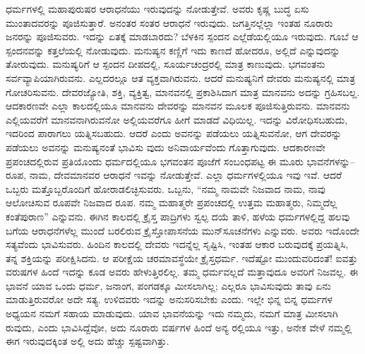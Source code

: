 ಧರ್ಮಗಳಲ್ಲಿ ಮಹಾಪುರುಷರ ಆರಾಧನೆಯು ಇರುವುದನ್ನು ನೋಡುತ್ತೇವೆ. ಅವರು ಕೃಷ್ಣ ಬುದ್ಧ ಏಸು ಮುಂತಾದವರನ್ನು ಪೂಜಿಸುತ್ತಾರೆ. ಅನಂತರ ಸಂತರ ಆರಾಧನೆ ಇರುವುದು. ಜಗತ್ತಿನಲ್ಲೆಲ್ಲಾ ಇಂತಹ ನೂರಾರು ಜನರನ್ನು ಪೂಜಿಸುವರು. ಇದನ್ನು ಏತಕ್ಕೆ ಮಾಡಬಾರದು? ಬೆಳಕಿನ ಸ್ಪಂದನ ಎಲ್ಲೆಡೆಯಲ್ಲಿಯೂ ಇರುವುದು. ಗೂಬೆ ಆ ಸ್ಪಂದನವನ್ನು ಕತ್ತಲೆಯಲ್ಲಿ ನೋಡುವುದು. ಮನುಷ್ಯನ ಕಣ್ಣಿಗೆ ಇದು ಕಾಣದೆ ಹೋದರೂ, ಅಲ್ಲಿದೆ ಎನ್ನುವುದನ್ನು ತೋರುವುದು. ಮನುಷ್ಯರಿಗೆ ಆ ಸ್ಪಂದನ ದೀಪದಲ್ಲಿ, ಸೂರ್ಯಚಂದ್ರರಲ್ಲಿ ಮಾತ್ರ ಕಾಣುವುದು. ಭಗವಂತನು ಸರ್ವವ್ಯಾಪಿಯಾಗಿರುವನು. ಎಲ್ಲದರಲ್ಲೂ ಆತ ವ್ಯಕ್ತವಾಗಿರುವನು. ಆದರೆ ಮನುಷ್ಯನಿಗೆ ದೇವರು ಮನುಷ್ಯನಲ್ಲಿ ಮಾತ್ರ ಗೋಚರಿಸುವನು. ದೇವರಜ್ಯೋತಿ, ಶಕ್ತಿ, ವ್ಯಕ್ತಿತ್ವ, ಮಾನವನಲ್ಲಿ ಪ್ರಕಾಶಿಸಿದಾಗ ಮಾತ್ರ ಮಾನವನು ಅದನ್ನು ಗ್ರಹಿಸಬಲ್ಲ. ಆದಕಾರಣವೇ ಎಲ್ಲಾ ಕಾಲದಲ್ಲಿಯೂ ಮಾನವನು ದೇವರನ್ನು ಮಾನವನ ಮೂಲಕ ಪೂಜಿಸುತ್ತಿರುವನು. ಮಾನವನು ಎಲ್ಲಿಯವರೆಗೆ ಮಾನವನಾಗಿರುವನೋ ಅಲ್ಲಿಯವರೆಗೂ ಹೀಗೆ ಮಾಡದೆ ವಿಧಿಯಿಲ್ಲ. ಇದನ್ನು ವಿರೋಧಿಸಬಹುದು, ಇದರಿಂದ ಪಾರಾಗಲು ಯತ್ನಿಸಬಹುದು. ಆದರೆ ಎಂದು ಅವನನ್ನು ಪಡೆಯಲು ಯತ್ನಿಸುವನೋ, ಆಗ ದೇವರನ್ನು ಪಡೆಯಲು ಅವನನ್ನು ಮನುಷ್ಯನಂತೆ ಭಾವಿಸು ವುದು ಅನಿವಾರ್ಯವೆಂದು ಗೊತ್ತಾಗುವುದು. ಆದಕಾರಣವೇ ಪ್ರಪಂಚದಲ್ಲಿರುವ ಪ್ರತಿಯೊಂದು ಧರ್ಮದಲ್ಲಿಯೂ ಭಗವಂತನ ಪೂಜೆಗೆ ಸಂಬಂಧಪಟ್ಟ ಈ ಮೂರು ಭಾವನೆಗಳನ್ನು–ರೂಪ, ನಾಮ, ದೇವಮಾನವರ ಆರಾಧನೆ ಇವನ್ನು ನೋಡುತ್ತೇವೆ. ಎಲ್ಲಾ ಧರ್ಮಗಳಲ್ಲಿಯೂ ಇವು ಇವೆ. ಆದರೆ ಒಬ್ಬರು ಮತ್ತೊಬ್ಬರೊಂದಿಗೆ ಹೋರಾಡಲಿಚ್ಛಿಸುವರು. ಒಬ್ಬನು, “ನಮ್ಮ ನಾಮವೇ ನಿಜವಾದ ನಾಮ, ನಾವು ಆಲೋಚಿಸುವ ರೂಪವೇ ನಿಜವಾದ ರೂಪ. ನಮ್ಮ ಮಹಾತ್ಮರೇ ಪ್ರಪಂಚದಲ್ಲಿ ಉತ್ತಮ ಮಹಾತ್ಮರು, ನಿಮ್ಮದೆಲ್ಲ ಕಂತೆಪುರಾಣ” ಎನ್ನುವನು. ಈಗಿನ ಕಾಲದಲ್ಲಿ ಕ್ರೈಸ್ತ ಪಾದ್ರಿಗಳು ಸ್ವಲ್ಪ ದಯೆ ತಾಳಿ, ಹಳೆಯ ಧರ್ಮಗಳಲ್ಲಿದ್ದ ಹಲವು ಬಗೆಯ ಆರಾಧನೆಗಳೆಲ್ಲ ಮುಂದೆ ಬರಲಿರುವ ಕ್ರೈಸ್ತೋಪಾಸನೆಯ ಮುನ್​ಸೂಚನೆಗಳು ಎನ್ನುವರು. ಅವರು ಇದೊಂದೇ ಸತ್ಯವೆಂದು ಭಾವಿಸುವರು. ಹಿಂದಿನ ಕಾಲದಲ್ಲಿ ದೇವರು ಇದನ್ನೆಲ್ಲ ಸೃಷ್ಟಿಸಿ, ಇಂತಹ ಆಕಾರ ಬರುವುದಕ್ಕೆ ಪ್ರಯತ್ನಿಸಿ, ತನ್ನ ಶಕ್ತಿಯನ್ನು ಪರೀಕ್ಷಿಸಿದನು. ಆ ಪರೀಕ್ಷೆಯ ಚರಮಾವಸ್ಥೆಯೇ ಕ್ರೈಸ್ತಧರ್ಮ. ಇದೆಷ್ಟೋ ಮುಂದುವರಿದಂತೆ! ಐವತ್ತು ವರುಷಗಳ ಹಿಂದೆ ಇದನ್ನು ಕೂಡ ಅವರು ಹೇಳುತ್ತಿರಲಿಲ್ಲ. ತಮ್ಮ ಧರ್ಮವಲ್ಲದೆ ಮತ್ತಾವುದೂ ಅವರಿಗೆ ನಿಜವಲ್ಲ. ಈ ಭಾವನೆ ಯಾವ ಒಂದು ಧರ್ಮ, ಜನಾಂಗ, ಪಂಗಡಕ್ಕೂ ಮೀಸಲಾಗಿಲ್ಲ; ಎಲ್ಲರೂ ಭಾವಿಸುವುದು ತಾವು ಏನು ಮಾಡುತ್ತಿರುವರೋ ಅದೇ ಸತ್ಯ. ಉಳಿದವರು ಇದನ್ನು ಅನುಸರಿಸಬೇಕು ಎಂದು. ಇಲ್ಲೇ ಭಿನ್ನ ಬಿನ್ನ ಧರ್ಮಗಳ ಅಧ್ಯಯನ ನಮಗೆ ಸಹಾಯ ಮಾಡುವುದು. ಯಾವ ಭಾವನೆಯನ್ನು ಇದು ನಮ್ಮದು, ನಮಗೆ ಮಾತ್ರ ಮೀಸಲಾಗಿ ರುವುದು, ಎಂದು ಭಾವಿಸಿದ್ದೆವೋ, ಅದು ನೂರಾರು ವರ್ಷಗಳ ಹಿಂದೆ ಅನ್ಯ ರಲ್ಲಿಯೂ ಇತ್ತು, ಅನೇಕ ವೇಳೆ ನಮ್ಮಲ್ಲಿ ಈಗ ಇರುವುದಕ್ಕಿಂತ ಅಲ್ಲಿ ಅದು ಹೆಚ್ಚು ಸ್ಪಷ್ಟವಾಗಿತ್ತು.


